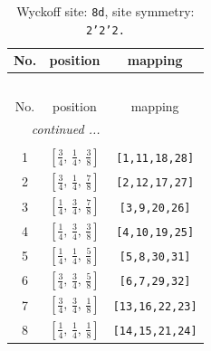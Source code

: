 \documentclass[fleqn,8pt]{jsarticle}
\begin{document}
\begin{longtable}{ccc}
\caption{Wyckoff site: {\tt 8d}, site symmetry: {\tt 2'2'2.}}
 \\
 \hline \hline
No. & position & mapping \\ \hline \endfirsthead

\multicolumn{2}{l}{\tablename\ \thetable{}} \\
 \hline \hline
No. & position & mapping \\ \hline \endhead

 \hline \hline
\multicolumn{2}{r}{\footnotesize\it continued ...} \\ \endfoot

 \hline \hline
\multicolumn{2}{r}{} \\ \endlastfoot

1 & $\left[ \frac{3}{4},\, \frac{1}{4},\, \frac{3}{8} \right]$ & {\tt [1,11,18,28]} \\ \hline
2 & $\left[ \frac{3}{4},\, \frac{1}{4},\, \frac{7}{8} \right]$ & {\tt [2,12,17,27]} \\ \hline
3 & $\left[ \frac{1}{4},\, \frac{3}{4},\, \frac{7}{8} \right]$ & {\tt [3,9,20,26]} \\ \hline
4 & $\left[ \frac{1}{4},\, \frac{3}{4},\, \frac{3}{8} \right]$ & {\tt [4,10,19,25]} \\ \hline
5 & $\left[ \frac{1}{4},\, \frac{1}{4},\, \frac{5}{8} \right]$ & {\tt [5,8,30,31]} \\ \hline
6 & $\left[ \frac{3}{4},\, \frac{3}{4},\, \frac{5}{8} \right]$ & {\tt [6,7,29,32]} \\ \hline
7 & $\left[ \frac{3}{4},\, \frac{3}{4},\, \frac{1}{8} \right]$ & {\tt [13,16,22,23]} \\ \hline
8 & $\left[ \frac{1}{4},\, \frac{1}{4},\, \frac{1}{8} \right]$ & {\tt [14,15,21,24]} \\
\end{longtable}
\renewcommand{\arraystretch}{1.2}
\end{document}
